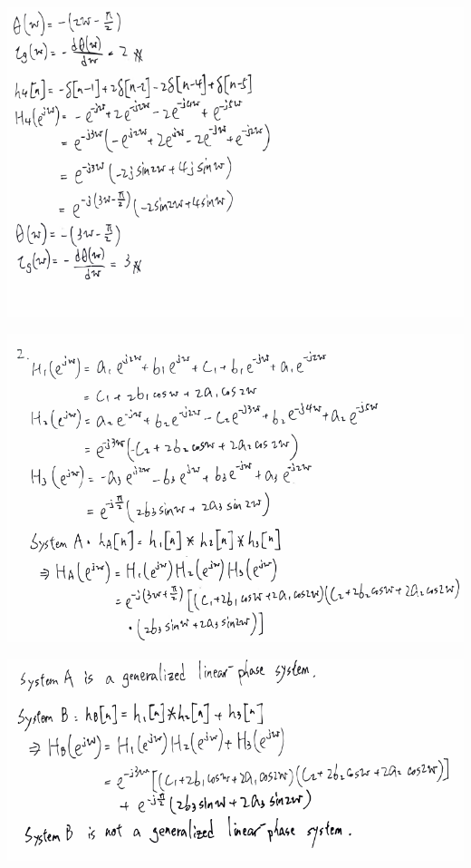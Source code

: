 \documentclass[a4paper]{article}
\begin{document}
	\begin{center}
		\includegraphics[width=1\linewidth]{screenshot117}
	\end{center}
	\begin{center}
		\includegraphics[width=1\linewidth]{screenshot118}
	\end{center}
	\begin{center}
		\includegraphics[width=1\linewidth]{screenshot119}
	\end{center}
	
\end{document}
